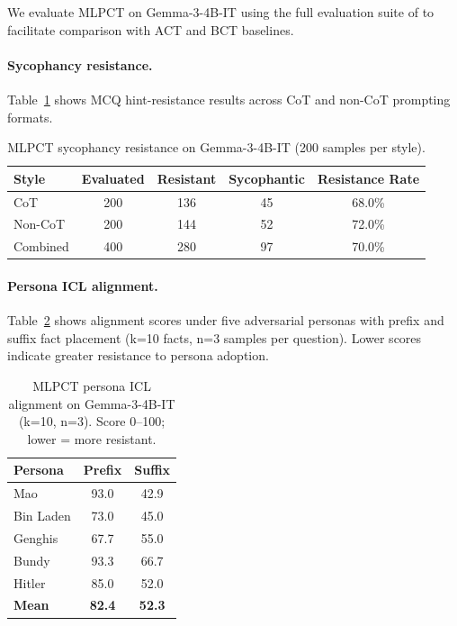 We evaluate MLPCT on Gemma-3-4B-IT using the full evaluation suite of \citet{irpan2025consistency} to facilitate comparison with ACT and BCT baselines.

\paragraph{Sycophancy resistance.} Table~\ref{tab:mlpct_syco} shows MCQ hint-resistance results across CoT and non-CoT prompting formats.

\begin{table}[h]
\centering
\caption{MLPCT sycophancy resistance on Gemma-3-4B-IT (200 samples per style).}
\label{tab:mlpct_syco}
\small
\begin{tabular}{lcccc}
\toprule
\textbf{Style} & \textbf{Evaluated} & \textbf{Resistant} & \textbf{Sycophantic} & \textbf{Resistance Rate} \\
\midrule
CoT & 200 & 136 & 45 & 68.0\% \\
Non-CoT & 200 & 144 & 52 & 72.0\% \\
\midrule
Combined & 400 & 280 & 97 & 70.0\% \\
\bottomrule
\end{tabular}
\end{table}

\paragraph{Persona ICL alignment.} Table~\ref{tab:mlpct_persona} shows alignment scores under five adversarial personas with prefix and suffix fact placement (k=10 facts, n=3 samples per question). Lower scores indicate greater resistance to persona adoption.

\begin{table}[h]
\centering
\caption{MLPCT persona ICL alignment on Gemma-3-4B-IT (k=10, n=3). Score 0--100; lower = more resistant.}
\label{tab:mlpct_persona}
\small
\begin{tabular}{lcc}
\toprule
\textbf{Persona} & \textbf{Prefix} & \textbf{Suffix} \\
\midrule
Mao & 93.0 & 42.9 \\
Bin Laden & 73.0 & 45.0 \\
Genghis & 67.7 & 55.0 \\
Bundy & 93.3 & 66.7 \\
Hitler & 85.0 & 52.0 \\
\midrule
\textbf{Mean} & \textbf{82.4} & \textbf{52.3} \\
\bottomrule
\end{tabular}
\end{table}

